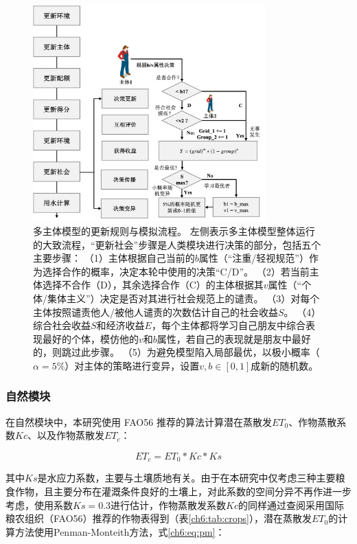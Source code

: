 \begin{figure}[htb]
    \centering
    \includegraphics[width=0.8\textwidth]{img/ch6/ch6_updates_diagram.png}
    \caption[多主体模型的更新规则与模拟流程]{多主体模型的更新规则与模拟流程。
    左侧表示多主体模型整体运行的大致流程，“更新社会”步骤是人类模块进行决策的部分，包括五个主要步骤：
        （1）主体根据自己当前的$b$属性（“注重/轻视规范”）作为选择合作的概率，决定本轮中使用的决策“C/D”。
        （2）若当前主体选择不合作（D），其余选择合作（C）的主体根据其$v$属性（“个体/集体主义”）决定是否对其进行社会规范上的谴责。
        （3）对每个主体按照谴责他人/被他人谴责的次数估计自己的社会收益$S$。
        （4）综合社会收益$S$和经济收益$E$，每个主体都将学习自己朋友中综合表现最好的个体，模仿他的$v$和$b$属性，若自己的表现就是朋友中最好的，则跳过此步骤。
        （5）为避免模型陷入局部最优，以极小概率（$\alpha = 5\%$）对主体的策略进行变异，设置$v, b \in [0, 1]$成新的随机数。
    }\label{ch6:fig:society}
\end{figure}

\subsubsection{自然模块}

在自然模块中，本研究使用 FAO56 推荐的算法计算潜在蒸散发$ET_0$、作物蒸散系数$Kc$、以及作物蒸散发$ET_c$：

\begin{equation}
    ET_c = ET_0 * Kc * Ks
    \label{ch6:eq:etc}
\end{equation}

其中$Ks$是水应力系数，主要与土壤质地有关。由于在本研究中仅考虑三种主要粮食作物，且主要分布在灌溉条件良好的土壤上，对此系数的空间分异不再作进一步考虑，使用系数$Ks = 0.3$进行估计，作物蒸散发系数$Kc$的同样通过查阅采用国际粮农组织（FAO56）推荐的作物表得到（表\ref{ch6:tab:crops}）\cite{chen2023}，潜在蒸散发$ET_0$的计算方法使用Penman-Monteith方法，式\ref{ch6:eq:pm}：

